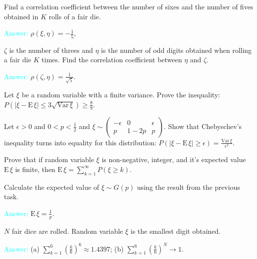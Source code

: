 \documentclass[14pt]{exam}
\def\Var{{\textrm{Var}}\,}
\def\E{{\textrm{E}}\,}
\begin{document}
\begin{questions}
		\question
		Find a correlation coefficient between the number of sixes and the number of fives obtained in $K$ rolls of a fair die.
		
		\textcolor{cyan}{Answer:} $\rho(\xi, \eta) = -\frac{1}{5}$,
		
		\question
		$\zeta$ is the number of threes and $\eta$ is the number of odd digits obtained when rolling a fair die $K$ times. Find the correlation coefficient between $\eta$ and $\zeta$.
		
		\textcolor{cyan}{Answer:} $\rho(\zeta, \eta) = \frac{1}{\sqrt{5}}$.
		
		\question
		Let $\xi$ be a random variable with a finite variance. Prove the inequality: $P(|\xi - \E\xi| \leq 3\sqrt{\Var\xi}) \geq \frac{8}{9}$.
		
		\question
		Let $\epsilon > 0$ and $0 < p < \frac{1}{2}$ and $\xi \sim \begin{pmatrix}
			-\epsilon & 0 & \epsilon\\
			p & 1 - 2p & p
		\end{pmatrix}$. Show that Chebyschev's inequality turns into equality for this distribution: $P(|\xi - \E\xi| \geq \epsilon) = \frac{\Var\xi}{\epsilon^2}$.
		
		\question
		Prove that if random variable $\xi$ is non-negative, integer, and it's expected value $\E\xi$ is finite, then $\E\xi = \sum_{k=1}^\infty P(\xi \geq k)$.
		
		\question
		Calculate the expected value of $\xi\sim G(p)$ using the result from the previous task.
		
		\textcolor{cyan}{Answer:} $\E\xi = \frac{1}{p}$.
		
		\question
		$N$ fair dice are rolled. Random variable $\xi$ is the smallest digit obtained.
		
		
		\textcolor{cyan}{Answer:} (a) $\sum_{k=1}^6 (\frac{k}{6})^6 \approx 1.4397$; (b) $\sum_{k=1}^6 (\frac{k}{6})^N \to 1$.
		

\end{questions}
\end{document}
